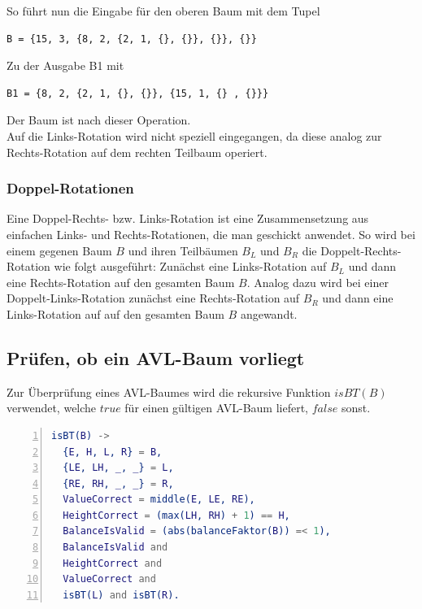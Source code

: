 \documentclass{article}
\begin{document}
  	So führt nun die Eingabe für den oberen Baum mit dem Tupel 
  	\begin{lstlisting}
B = {15, 3, {8, 2, {2, 1, {}, {}}, {}}, {}}
  	\end{lstlisting}
	Zu der Ausgabe B1 mit 
	\begin{lstlisting}
B1 = {8, 2, {2, 1, {}, {}}, {15, 1, {} , {}}}
	\end{lstlisting}
  	
  	Der Baum ist nach dieser Operation.\\
  	Auf die Links-Rotation wird nicht speziell eingegangen, da diese analog zur Rechts-Rotation auf dem rechten Teilbaum operiert.
  	
	\subsubsection{Doppel-Rotationen}
	
	Eine Doppel-Rechts- bzw. Links-Rotation ist eine Zusammensetzung aus einfachen Links- und Rechts-Rotationen, die man geschickt anwendet. So wird bei einem gegenen Baum $B$ und ihren Teilbäumen $B_L$ und $B_R$ die Doppelt-Rechts-Rotation wie folgt ausgeführt: Zunächst eine Links-Rotation auf $B_L$ und dann eine Rechts-Rotation auf den gesamten Baum $B$. Analog dazu wird bei einer Doppelt-Links-Rotation zunächst eine Rechts-Rotation auf $B_R$ und dann eine Links-Rotation auf auf den gesamten Baum $B$ angewandt.
	
	\subsection{Prüfen, ob ein AVL-Baum vorliegt}
	
	Zur Überprüfung eines AVL-Baumes wird die rekursive Funktion $isBT(B)$ verwendet, welche $true$ für einen gültigen AVL-Baum liefert, $false$ sonst.
	
\begin{lstlisting}[language=erlang,numbers=left]
isBT(B) ->
  {E, H, L, R} = B,
  {LE, LH, _, _} = L,
  {RE, RH, _, _} = R,
  ValueCorrect = middle(E, LE, RE),
  HeightCorrect = (max(LH, RH) + 1) == H,
  BalanceIsValid = (abs(balanceFaktor(B)) =< 1),
  BalanceIsValid and
  HeightCorrect and 
  ValueCorrect and 
  isBT(L) and isBT(R).
\end{lstlisting}
	
\end{document}
